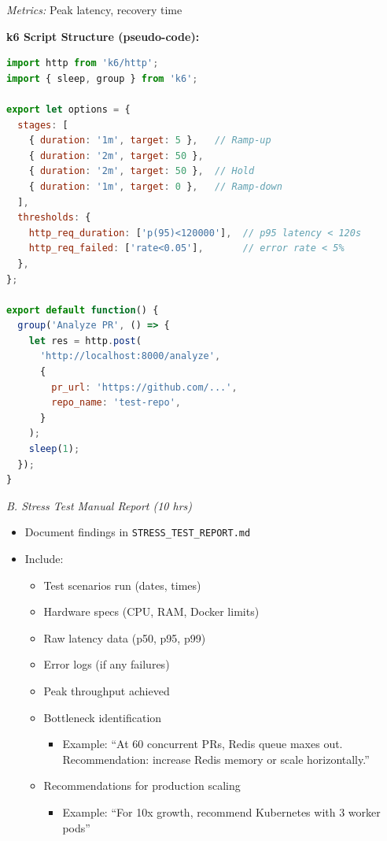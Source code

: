 \documentclass[11pt,a4paper]{article}
\begin{document}
\textit{Metrics:} Peak latency, recovery time

\textbf{k6 Script Structure (pseudo-code):}
\begin{lstlisting}[language=JavaScript]
import http from 'k6/http';
import { sleep, group } from 'k6';

export let options = {
  stages: [
    { duration: '1m', target: 5 },   // Ramp-up
    { duration: '2m', target: 50 },
    { duration: '2m', target: 50 },  // Hold
    { duration: '1m', target: 0 },   // Ramp-down
  ],
  thresholds: {
    http_req_duration: ['p(95)<120000'],  // p95 latency < 120s
    http_req_failed: ['rate<0.05'],       // error rate < 5%
  },
};

export default function() {
  group('Analyze PR', () => {
    let res = http.post(
      'http://localhost:8000/analyze',
      {
        pr_url: 'https://github.com/...',
        repo_name: 'test-repo',
      }
    );
    sleep(1);
  });
}
\end{lstlisting}

\textit{B. Stress Test Manual Report (10 hrs)}
\begin{itemize}[leftmargin=*]
    \item Document findings in \texttt{STRESS\_TEST\_REPORT.md}
    \item Include:
    \begin{itemize}
        \item Test scenarios run (dates, times)
        \item Hardware specs (CPU, RAM, Docker limits)
        \item Raw latency data (p50, p95, p99)
        \item Error logs (if any failures)
        \item Peak throughput achieved
        \item Bottleneck identification
        \begin{itemize}
            \item Example: ``At 60 concurrent PRs, Redis queue maxes out. Recommendation: increase Redis memory or scale horizontally.''
        \end{itemize}
        \item Recommendations for production scaling
        \begin{itemize}
            \item Example: ``For 10x growth, recommend Kubernetes with 3 worker pods''
        \end{itemize}
    \end{itemize}
\end{itemize}
\end{document}
